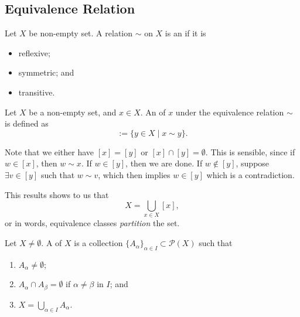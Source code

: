 \documentclass[notoc,notitlepage]{tufte-book}
\begin{document}
\subsection{Equivalence Relation}%
\label{sub:equivalence_relation}

\begin{defn}\label{defn:equivalence_relation}
  Let $X$ be non-empty set. A relation $\sim$ on $X$ is an  if it is
  \begin{itemize}
    \item reflexive; 
    \item symmetric; and
    \item transitive.
  \end{itemize}
\end{defn}

\begin{defn}\label{defn:equivalence_class}
  Let $X$ be a non-empty set, and $x \in X$. An  of $x$ under the equivalence relation $\sim$ is defined as
  \begin{equation*}
    [x] := \{ y \in X \mid x \sim y \}.
  \end{equation*}
\end{defn}

\begin{note}
  Note that we either have $[x] = [y]$ or $[x] \cap [y] = \emptyset$. This is sensible, since if $w \in [x]$, then $w \sim x$. If $w \in [y]$, then we are done. If $w \notin [y]$, suppose $\exists v \in [y]$ such that $w \sim v$, which then implies $w \in [y]$ which is a contradiction.

  This results shows to us that
  \begin{equation*}
    X = \bigcup_{x \in X} [x],
  \end{equation*}
  or in words, equivalence classes \textit{partition} the set.
\end{note}

\begin{defn}[Partition]\label{defn:partition}
  Let $X \neq \emptyset$. A  of $X$ is a collection $\{A_{\alpha} \}_{\alpha \in I} \subset \mathcal{P}(X)$ such that
  \begin{enumerate}
    \item $A_\alpha \neq \emptyset$;
    \item $A_{\alpha} \cap A_{\beta} = \emptyset$ if $\alpha \neq \beta$ in $I$; and
    \item $X = \bigcup_{\alpha \in I} A_\alpha$.
  \end{enumerate}
\end{defn}
\end{document}
